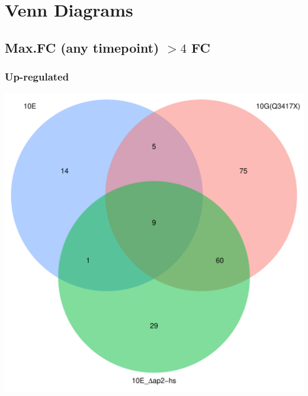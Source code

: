 \documentclass{article}\usepackage[]{graphicx}\usepackage[]{color}
\newenvironment{knitrout}{}{} %
\begin{document}

\section{Venn Diagrams}

\subsection{Max.FC (any timepoint) $>4$ FC}
\subsubsection{Up-regulated}

\begin{knitrout}
\color{fgcolor}

{\centering \includegraphics[width=1\linewidth,height=.4\textheight]{figure/minimal-venn_alltimes_3fc_up_venn-1} 

}



\end{knitrout}
\end{document}
